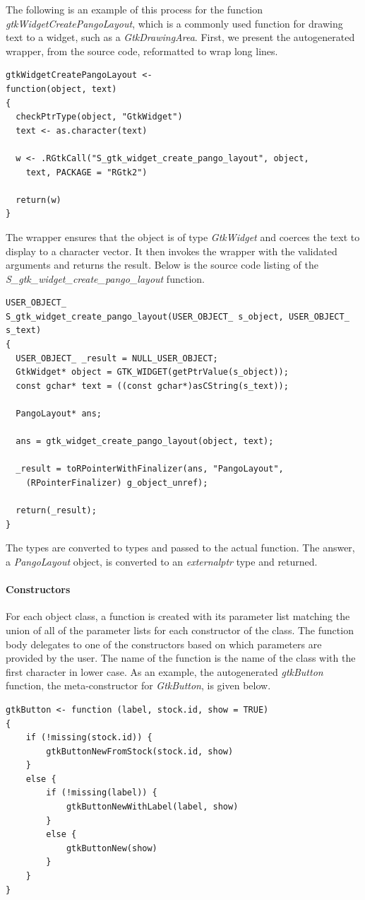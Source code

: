 \documentclass[article]{jss}
\begin{document}
The following is an example of this process for the function 
\emph{gtkWidgetCreatePangoLayout}, which is a commonly used function for
drawing text to a widget, such as a \emph{GtkDrawingArea}. First, we present
the autogenerated  wrapper, from the  source code, 
reformatted to wrap long lines.
\begin{verbatim}
gtkWidgetCreatePangoLayout <-
function(object, text)
{
  checkPtrType(object, "GtkWidget")
  text <- as.character(text)

  w <- .RGtkCall("S_gtk_widget_create_pango_layout", object, 
    text, PACKAGE = "RGtk2")

  return(w)
}
\end{verbatim}
The wrapper ensures that the object is of type \emph{GtkWidget} and coerces
the text to display to a character vector. It then invokes the 
wrapper with the validated arguments and returns the result. Below is the
source code listing of the \emph{S\_gtk\_widget\_create\_pango\_layout} function.
\begin{verbatim}
USER_OBJECT_
S_gtk_widget_create_pango_layout(USER_OBJECT_ s_object, USER_OBJECT_ s_text)
{
  USER_OBJECT_ _result = NULL_USER_OBJECT;
  GtkWidget* object = GTK_WIDGET(getPtrValue(s_object));
  const gchar* text = ((const gchar*)asCString(s_text));

  PangoLayout* ans;

  ans = gtk_widget_create_pango_layout(object, text);

  _result = toRPointerWithFinalizer(ans, "PangoLayout", 
    (RPointerFinalizer) g_object_unref);

  return(_result);
}
\end{verbatim}
The  types are converted to  types and passed to
the actual  function. The answer, a \emph{PangoLayout} object, is
converted to an  \emph{externalptr} type and returned.

\paragraph{Constructors}

For each object class, a function is created with its parameter list matching 
the union of all of the parameter lists for each constructor of the class.
The function body delegates to one of the constructors based on which
parameters are provided by the user. The name of the function is the name
of the class with the first character in lower case. As an example, the 
autogenerated \emph{gtkButton} function, the meta-constructor for \emph{GtkButton},
is given below.
\begin{verbatim}
gtkButton <- function (label, stock.id, show = TRUE) 
{
    if (!missing(stock.id)) {
        gtkButtonNewFromStock(stock.id, show)
    }
    else {
        if (!missing(label)) {
            gtkButtonNewWithLabel(label, show)
        }
        else {
            gtkButtonNew(show)
        }
    }
}
\end{verbatim}
\end{document}
